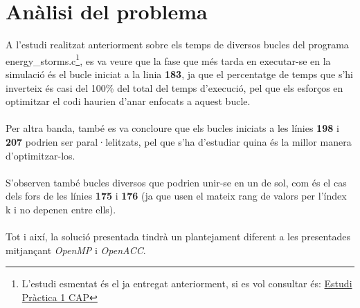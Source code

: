 \documentclass[a4paper, 11pt]{article}
\begin{document}
\section{Anàlisi del problema}
A l'estudi realitzat anteriorment sobre els temps de diversos bucles del programa \textcolor{darkpastelgreen}{energy\_storms.c}\footnote{L'estudi esmentat és el ja entregat anteriorment, si es vol consultar és: \textcolor{blue}{\href{https://drive.google.com/file/d/1cSu44VuoF-0nm9SR1Bhz5VClLV0hwk4E/view?usp=sharing}{Estudi Pràctica 1 CAP}}}, es va veure que la fase que més tarda en executar-se en la simulació és el bucle iniciat a la linia \textbf{183}, ja que el percentatge de temps que s'hi inverteix és casi del 100\% del total del temps d'execució, pel que els esforços en optimitzar el codi haurien d'anar enfocats a aquest bucle.\\\\
Per altra banda, també es va concloure que els bucles iniciats a les línies \textbf{198} i \textbf{207} podrien ser paral·lelitzats, pel que s'ha d'estudiar quina és la millor manera d'optimitzar-los.\\\\
S'observen també bucles diversos que podrien unir-se en un de sol, com és el cas dels fors de les línies \textbf{175} i \textbf{176} (ja que usen el mateix rang de valors per l'índex k i no depenen entre ells).\\\\
Tot i així, la solució presentada tindrà un plantejament diferent a les presentades mitjançant \textit{OpenMP} i \textit{OpenACC}.

\newpage
\end{document}
